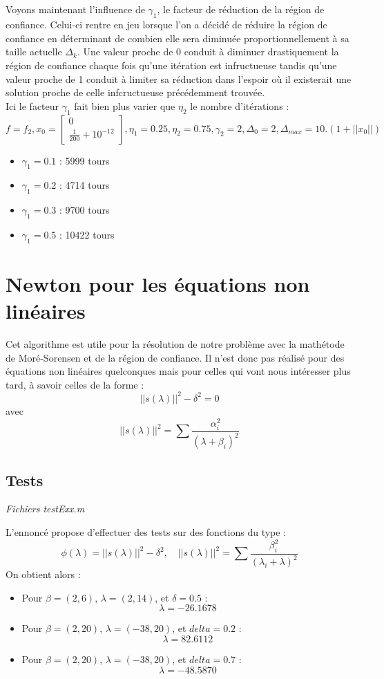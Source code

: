 \documentclass[12pt]{article}	%
\begin{document}
\subparagraph{}
Voyons maintenant l'influence de $\gamma_1$, le facteur de réduction de la région de confiance. Celui-ci rentre en jeu lorsque l'on a décidé de réduire la région de confiance en déterminant de combien elle sera diminuée proportionnellement à sa taille actuelle $\Delta_k$. Une valeur proche de 0 conduit à diminuer drastiquement la région de confiance chaque fois qu'une itération est infructueuse tandis qu'une valeur proche de 1 conduit à limiter sa réduction dans l'espoir où il existerait une solution proche de celle infcructueuse précédemment trouvée.
\\
Ici le facteur $\gamma_1$ fait bien plus varier que $\eta_2$ le nombre d'itérations :
	\[f = f_2, x_0 = \left[\begin{array}{c}0\\\frac{1}{200}+10^{-12}\end{array}\right], \eta_1 = 0.25, \eta_2 = 0.75, \gamma_2 = 2, \Delta_0 = 2, \Delta_{max} = 10.(1 + ||x_0||)\]
\begin{itemize}
	\item $\gamma_1 = 0.1$ : 5999 tours
	\item $\gamma_1 = 0.2$ : 4714 tours
	\item $\gamma_1 = 0.3$ : 9700 tours
	\item $\gamma_1 = 0.5$ : 10422 tours
\end{itemize}

\section{Newton pour les équations non linéaires}
Cet algorithme est utile pour la résolution de notre problème avec la mathétode de Moré-Sorensen et de la région de confiance. Il n'est donc pas réalisé pour des équations non linéaires quelconques mais pour celles qui vont nous intéresser plus tard, à savoir celles de la forme : \[||s(\lambda)||^2 - \delta^2 = 0\] avec \[||s(\lambda)||^2 = \sum{\frac{\alpha_i^2}{(\lambda + \beta_i)^2}}\]

\subsection{Tests}
\begin{flushright}
\textit{Fichiers testExx.m}
\end{flushright}
L'ennoncé propose d'effectuer des tests sur des fonctions du type :
	\[\phi(\lambda) = ||s(\lambda)||^2 - \delta^2,\quad ||s(\lambda)||^2 = \sum{\frac{\beta_i^2}{(\lambda_i + \lambda)^2}}\]
On obtient alors :
\begin{itemize}
	\item Pour $\beta = (2, 6)$, $\lambda = (2, 14)$, et $\delta = 0.5$ :
		\[\lambda = -26.1678\]
	\item Pour $\beta = (2, 20)$, $\lambda = (-38, 20)$, et $delta = 0.2$ :
		\[\lambda = 82.6112\]
	\item Pour $\beta = (2, 20)$, $\lambda = (-38, 20)$, et $delta = 0.7$ :
		\[\lambda = -48.5870\]
\end{itemize}
\end{document}
